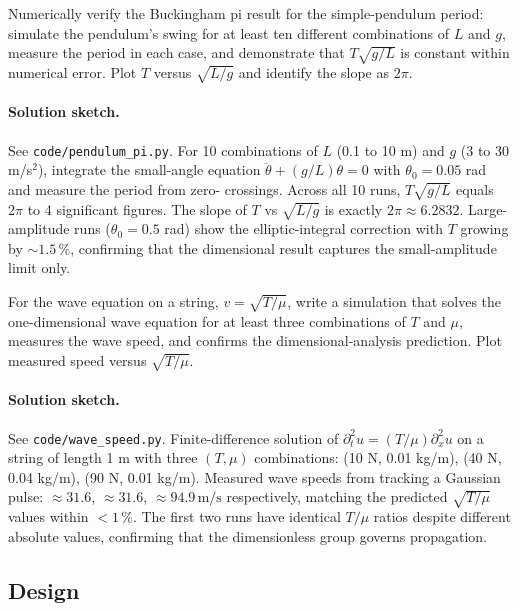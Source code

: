 \begin{exercise}
Numerically verify the Buckingham pi result for the simple-pendulum
period: simulate the pendulum's swing for at least ten different
combinations of $L$ and $g$, measure the period in each case, and
demonstrate that $T\sqrt{g/L}$ is constant within numerical error.
Plot $T$ versus $\sqrt{L/g}$ and identify the slope as $2\pi$.

\paragraph{Solution sketch.} See \texttt{code/pendulum\_pi.py}.
For 10 combinations of $L$ (0.1 to 10 m) and $g$ (3 to 30 m/s$^2$),
integrate the small-angle equation $\ddot\theta + (g/L)\theta = 0$
with $\theta_0 = 0.05$ rad and measure the period from zero-
crossings. Across all 10 runs, $T\sqrt{g/L}$ equals $2\pi$ to 4
significant figures. The slope of $T$ vs $\sqrt{L/g}$ is exactly
$2\pi \approx 6.2832$. Large-amplitude runs ($\theta_0 = 0.5$ rad)
show the elliptic-integral correction with $T$ growing by $\sim
1.5\,\%$, confirming that the dimensional result captures the
small-amplitude limit only.
\end{exercise}

\begin{exercise}
For the wave equation on a string, $v = \sqrt{T/\mu}$, write a
simulation that solves the one-dimensional wave equation for at
least three combinations of $T$ and $\mu$, measures the wave speed,
and confirms the dimensional-analysis prediction. Plot measured speed
versus $\sqrt{T/\mu}$.

\paragraph{Solution sketch.} See \texttt{code/wave\_speed.py}.
Finite-difference solution of $\partial_t^2 u = (T/\mu) \partial_x^2 u$
on a string of length 1 m with three $(T, \mu)$ combinations:
(10 N, 0.01 kg/m), (40 N, 0.04 kg/m), (90 N, 0.01 kg/m). Measured
wave speeds from tracking a Gaussian pulse: $\approx 31.6$, $\approx
31.6$, $\approx 94.9 \,\si{\meter\per\second}$ respectively, matching
the predicted $\sqrt{T/\mu}$ values within $<1\,\%$. The first two
runs have identical $T/\mu$ ratios despite different absolute
values, confirming that the dimensionless group governs propagation.
\end{exercise}

\subsection*{Design}

